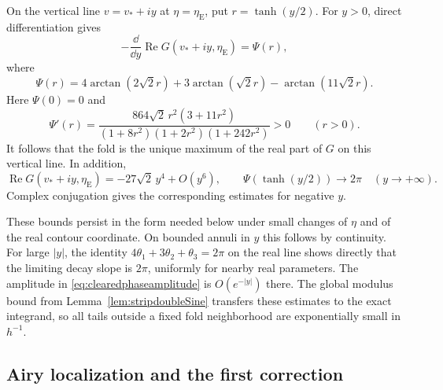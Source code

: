 On the vertical line $v=v_*+iy$ at $\eta=\eta_{\mathrm E}$,
put $r=\tanh(y/2)$. For $y>0$, direct differentiation gives
\begin{equation}
 -\frac{\dd}{\dd y}\operatorname{Re}G(v_*+iy,\eta_{\mathrm E})
 =\Psi(r),
 \label{eq:verticalphasegap}
\end{equation}
where
\[
 \Psi(r)=4\arctan(2\sqrt2r)
          +3\arctan(\sqrt2r)-\arctan(11\sqrt2r).
\]
Here $\Psi(0)=0$ and
\begin{equation}
 \Psi'(r)=
 \frac{864\sqrt2\,r^2(3+11r^2)}
 {(1+8r^2)(1+2r^2)(1+242r^2)}>0
 \qquad(r>0).
 \label{eq:verticalphasepositivity}
\end{equation}
It follows that the fold is the unique maximum of the real part
of $G$ on this vertical line. In addition,
\[
 \operatorname{Re}G(v_*+iy,\eta_{\mathrm E})
   =-27\sqrt2\,y^4+O(y^6),\qquad
 \Psi(\tanh(y/2))\longrightarrow2\pi
 \quad(y\to+\infty).
\]
Complex conjugation gives the corresponding estimates for
negative $y$.

These bounds persist in the form needed below under small
changes of $\eta$ and of the real contour coordinate. On bounded
annuli in $y$ this follows by continuity. For large $|y|$,
the identity
$4\theta_1+3\theta_2+\theta_3=2\pi$ on the real line
shows directly that the limiting decay slope is $2\pi$,
uniformly for nearby real parameters. The amplitude in
\eqref{eq:clearedphaseamplitude} is $O(e^{-|y|})$ there.
The global modulus bound from
Lemma~\ref{lem:stripdoubleSine} transfers these estimates to
the exact integrand, so all tails outside a fixed fold
neighborhood are exponentially small in $h^{-1}$.

\subsection{Airy localization and the first correction}

